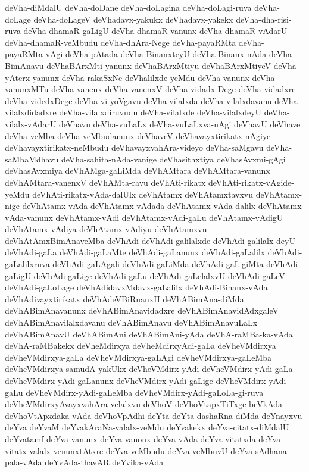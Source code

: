 {deVha-diMdalU
deVha-doDane
deVha-doLagina
deVha-doLagi-ruva
deVha-doLage
deVha-doLageV
deVhadavx-yakukx
deVhadavx-yakekx
deVha-dha-risi-ruva
deVha-dhamaR-gaLigU
deVha-dhamaR-vanunx
deVha-dhamaR-vAdarU
deVha-dhamaR-veMbudu
deVha-dhAra-Nege
deVha-payaRMta
deVha-payaRMta-vAgi
deVha-pAtada
deVha-BinanxteyU
deVha-Binanx-nAda
deVha-BimAnavu
deVhaBArxMti-yanunx
deVhaBArxMtiyu
deVhaBArxMtiyeV
deVha-yAterx-yanunx
deVha-rakaSxNe
deVhalilxde-yeMdu
deVha-vanunx
deVha-vanunxMTu
deVha-vanenx
deVha-vanenxV
deVha-vidadx-Dege
deVha-vidadxre
deVha-videdxDege
deVha-vi-yoVgavu
deVha-vilalxda
deVha-vilalxdavanu
deVha-vilalxdidadxre
deVha-vilalxdiruvudu
deVha-vilalxde
deVha-vilalxdeyU
deVha-vilalx-vAdarU
deVhavu
deVha-vuLaLx
deVha-vuLaLxva-nAgi
deVhavU
deVhave
deVha-veMba
deVha-veMbudanunx
deVhaveV
deVhavayxtirikatx-nAgiye
deVhavayxtirikatx-neMbudu
deVhavayxvahAra-videyo
deVha-saMgavu
deVha-saMbaMdhavu
deVha-sahita-nAda-vanige
deVhasithxtiya
deVhasAvxmi-gAgi
deVhasAvxmiya
deVhAMga-gaLiMda
deVhAMtara
deVhAMtara-vanunx
deVhAMtara-vanenxV
deVhAMta-ravu
deVhAti-rikatx
deVhAti-rikatx-vAgide-yeMdu
deVhAti-rikatx-vAda-dalUlx
deVhAtamx
deVhAtamxtavxvu
deVhAtamx-nige
deVhAtamx-vAda
deVhAtamx-vAdada
deVhAtamx-vAda-dalilx
deVhAtamx-vAda-vanunx
deVhAtamx-vAdi
deVhAtamx-vAdi-gaLu
deVhAtamx-vAdigU
deVhAtamx-vAdiya
deVhAtamx-vAdiyu
deVhAtamxvu
deVhAtAmxBimAnaveMba
deVhAdi
deVhAdi-galilalxde
deVhAdi-galilalx-deyU
deVhAdi-gaLa
deVhAdi-gaLaMte
deVhAdi-gaLanunx
deVhAdi-gaLalilx
deVhAdi-gaLalilxruva
deVhAdi-gaLAgali
deVhAdi-gaLiMda
deVhAdi-gaLigiMta
deVhAdi-gaLigU
deVhAdi-gaLige
deVhAdi-gaLu
deVhAdi-gaLelalxvU
deVhAdi-gaLeV
deVhAdi-gaLoLage
deVhAdidavxMdavx-gaLalilx
deVhAdi-Binanx-vAda
deVhAdivayxtirikatx
deVhAdeVBiRnanxH
deVhABimAna-diMda
deVhABimAnavanunx
deVhABimAnavidadxre
deVhABimAnavidAdxgaleV
deVhABimAnavilalxdavanu
deVhABimAnavu
deVhABimAnavuLaLx
deVhABimAnavU
deVhABimAni
deVhABimAni-yAda
deVhA-raMBa-ka-vAda
deVhA-raMBakekx
deVheMdirxya
deVheMdirxyAdi-gaLa
deVheVMdirxya
deVheVMdirxya-gaLa
deVheVMdirxya-gaLAgi
deVheVMdirxya-gaLeMba
deVheVMdirxya-samudA-yakUkx
deVheVMdirx-yAdi
deVheVMdirx-yAdi-gaLa
deVheVMdirx-yAdi-gaLanunx
deVheVMdirx-yAdi-gaLige
deVheVMdirx-yAdi-gaLu
deVheVMdirx-yAdi-gaLeMba
deVheVMdirx-yAdi-gaLoLa-gi-ruva
deVheVMdirxyAvayxvahAra-velalxvu
deVhoV
deVhoVtapxTiTxge-beVkAda
deVhoVtApxdaka-vAda
deVhoVpAdhi
deYta
deYta-dashaRna-diMda
deYnayxvu
deYva
deYvaM
deYvakAraNa-valalx-veMdu
deYvakekx
deYva-citatx-diMdalU
deYvatamf
deYva-vanunx
deYva-vanonx
deYva-vAda
deYva-vitatxda
deYva-vitatx-valalx-venunxtAtxre
deYva-veMbudu
deYva-veMbuvU
deYva-sAdhana-pala-vAda
deYvAda-thavAR
deYvika-vAda
}
